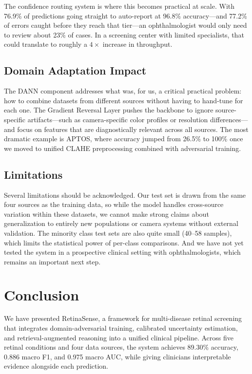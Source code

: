 \documentclass[conference]{IEEEtran}
\begin{document}
The confidence routing system is where this becomes practical at scale. With 76.9\% of predictions going straight to auto-report at 96.8\% accuracy---and 77.2\% of errors caught before they reach that tier---an ophthalmologist would only need to review about 23\% of cases. In a screening center with limited specialists, that could translate to roughly a $4\times$ increase in throughput.

\subsection{Domain Adaptation Impact}

The DANN component addresses what was, for us, a critical practical problem: how to combine datasets from different sources without having to hand-tune for each one. The Gradient Reversal Layer pushes the backbone to ignore source-specific artifacts---such as camera-specific color profiles or resolution differences---and focus on features that are diagnostically relevant across all sources. The most dramatic example is APTOS, where accuracy jumped from 26.5\% to 100\% once we moved to unified CLAHE preprocessing combined with adversarial training.

\subsection{Limitations}

Several limitations should be acknowledged. Our test set is drawn from the same four sources as the training data, so while the model handles cross-source variation within these datasets, we cannot make strong claims about generalization to entirely new populations or camera systems without external validation. The minority class test sets are also quite small (40--58 samples), which limits the statistical power of per-class comparisons. And we have not yet tested the system in a prospective clinical setting with ophthalmologists, which remains an important next step.

\section{Conclusion}

We have presented RetinaSense, a framework for multi-disease retinal screening that integrates domain-adversarial training, calibrated uncertainty estimation, and retrieval-augmented reasoning into a unified clinical pipeline. Across five retinal conditions and four data sources, the system achieves 89.30\% accuracy, 0.886 macro F1, and 0.975 macro AUC, while giving clinicians interpretable evidence alongside each prediction.
\end{document}
